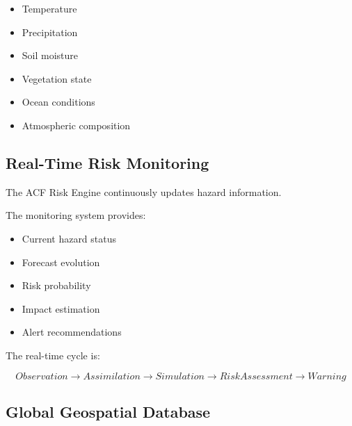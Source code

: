 \begin{itemize}

\item Temperature

\item Precipitation

\item Soil moisture

\item Vegetation state

\item Ocean conditions

\item Atmospheric composition

\end{itemize}



\subsection{Real-Time Risk Monitoring}

The ACF Risk Engine continuously updates hazard information.

The monitoring system provides:

\begin{itemize}

\item Current hazard status

\item Forecast evolution

\item Risk probability

\item Impact estimation

\item Alert recommendations

\end{itemize}


The real-time cycle is:

\[
Observation
\rightarrow
Assimilation
\rightarrow
Simulation
\rightarrow
RiskAssessment
\rightarrow
Warning
\]


\subsection{Global Geospatial Database}

